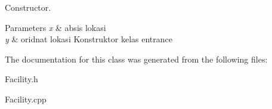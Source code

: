 Constructor. 


\begin{DoxyParams}{Parameters}
{\em x} & absis lokasi \\
\hline
{\em y} & oridnat lokasi Konstruktor kelas entrance \\
\hline
\end{DoxyParams}


The documentation for this class was generated from the following files\+:\begin{DoxyCompactItemize}
\item 
Facility.\+h\item 
Facility.\+cpp\end{DoxyCompactItemize}
